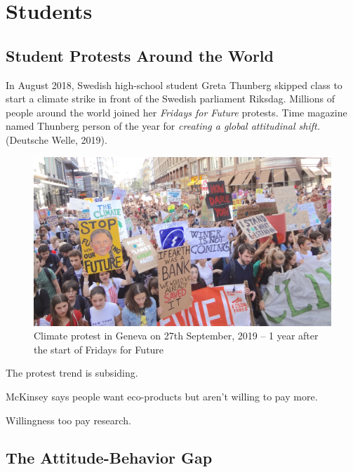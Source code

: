 \documentclass[
  letterpaper,
  DIV=11,
  numbers=noendperiod]{scrartcl}
\begin{document}
\newpage

\section{Students}\label{students}

\subsection{Student Protests Around the
World}\label{student-protests-around-the-world}

In August 2018, Swedish high-school student Greta Thunberg skipped class
to start a climate strike in front of the Swedish parliament Riksdag.
Millions of people around the world joined her \emph{Fridays for Future}
protests. Time magazine named Thunberg person of the year for
\emph{creating a global attitudinal shift.} (Deutsche Welle, 2019).

\begin{figure}[H]

{\centering \includegraphics[width=1\textwidth,height=\textheight]{./images/college/geneve.jpg}

}

\caption{Climate protest in Geneva on 27th September, 2019 -- 1 year
after the start of Fridays for Future}

\end{figure}%

The protest trend is subsiding.

McKinsey says people want eco-products but aren't willing to pay more.

Willingness too pay research.

\subsection{The Attitude-Behavior Gap}\label{the-attitude-behavior-gap}
\end{document}
